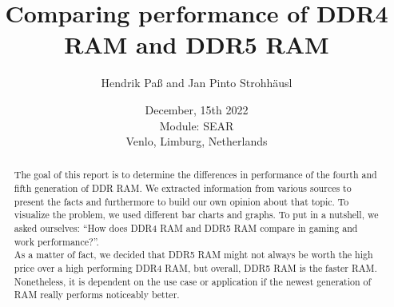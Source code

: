 \documentclass[]{report}
\title{Comparing performance of DDR4 RAM and DDR5 RAM}
\author{Hendrik Paß and Jan Pinto Strohhäusl}
\date{December, 15th 2022 \\Module: SEAR \\Venlo, Limburg, Netherlands}
\begin{document}
\maketitle

\begin{abstract}
    The goal of this report is to determine the differences in performance of the fourth and fifth generation of DDR RAM. We extracted information from various sources to present the facts and furthermore to build our own opinion about that topic. To visualize the problem, we used different bar charts and graphs. To put in a nutshell, we asked ourselves: “How does DDR4 RAM and DDR5 RAM compare in gaming and work performance?”.
    \\
    As a matter of fact, we decided that DDR5 RAM might not always be worth the high price over a high performing DDR4 RAM, but overall, DDR5 RAM is the faster RAM. Nonetheless, it is dependent on the use case or application if the newest generation of RAM really performs noticeably better.     
\end{abstract}

\tableofcontents
\setcounter{page}{3}
\listoffigures
\listoftables
\printglossary[title=Abbreviations]

\pagebreak
{}	






\printbibliography[title=References]
\end{document}
